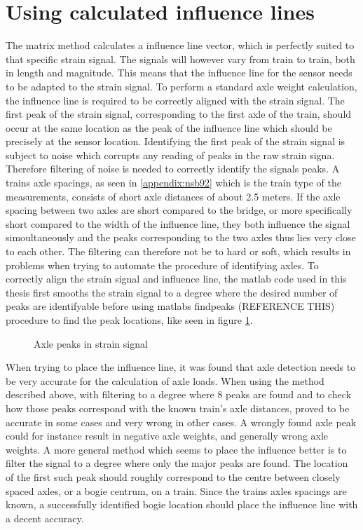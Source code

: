 \section{Using calculated influence lines}
\label{section:using_influence_lines}
The matrix method calculates a influence line vector, which is perfectly suited to that specific strain signal. The signals will however vary from train to train, both in length and magnitude. This means that the influence line for the sensor needs to be adapted to the strain signal.
To perform a standard axle weight calculation, the influence line is required to be correctly aligned with the strain signal.
The first peak of the strain signal, corresponding to the first axle of the train, should occur at the same location as the peak of the influence line which should be precisely at the sensor location.
Identifying the first peak of the strain signal is subject to noise which corrupts any reading of peaks in the raw strain signa. Therefore filtering of noise is needed to correctly identify the signals peaks. A trains axle spacings, as seen in \ref{appendix:nsb92} which is the train type of the measurements, consists of short axle distances of about 2.5 meters. If the axle spacing between two axles are short compared to the bridge, or more specifically short compared to the width of the influence line, they both influence the signal simoultaneously and the peaks corresponding to the two axles thus lies very close to each other. The filtering can therefore not be to hard or soft, which results in problems when trying to automate the procedure of identifying axles.
To correctly align the strain signal and influence line, the matlab code used in this thesis first smooths the strain signal to a degree where the desired number of peaks are identifyable before using matlabs findpeaks (REFERENCE THIS) procedure to find the peak locations, like seen in figure \ref{fig:axle_peaks}.
\begin{figure}[htbp]
	\begin{adjustbox}{center}
		
	\end{adjustbox}
	\caption{Axle peaks in strain signal}
	\label{fig:axle_peaks}
\end{figure}
When trying to place the influence line, it was found that axle detection needs to be very accurate for the calculation of axle loads. When using the method described above, with filtering to a degree where 8 peaks are found and to check how those peaks correspond with the known train's axle distances, proved to be accurate in some cases and very wrong in other cases. A wrongly found axle peak could for instance result in negative axle weights, and generally wrong axle weights. A more general method which seems to place the influence better is to filter the signal to a degree where only the major peaks are found. The location of the first such peak should roughly correspond to the centre between closely spaced axles, or a bogie centrum, on a train. Since the trains axles spacings are known, a successfully identified bogie location should place the influence line with a decent accuracy.
